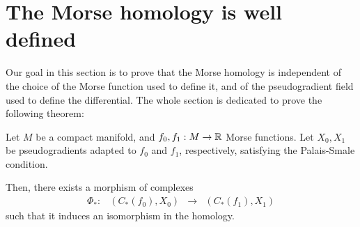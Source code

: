 \section{The Morse homology is well defined} \label{section:morse_well_defined}

Our goal in this section is to prove that the Morse homology is independent of the choice of the Morse function used to define it, and of the pseudogradient field used to define the differential. The whole section is dedicated to prove the following theorem:

\begin{theo}
Let $M$ be a compact manifold, and $f_0, f_1 : M \rightarrow \mathbb{R}$ Morse functions. Let $X_0, X_1$ be pseudogradients adapted to $f_0$ and $f_1$, respectively, satisfying the Palais-Smale condition.

Then, there exists a morphism of complexes
\begin{equation} \label{morphism}
\begin{array}{rccc} \Phi_{\ast} : & (C_{\ast}(f_0), X_0) & \longrightarrow & (C_{\ast}(f_1), X_1) \end{array}
\end{equation}
such that it induces an isomorphism in the homology.
\end{theo}


